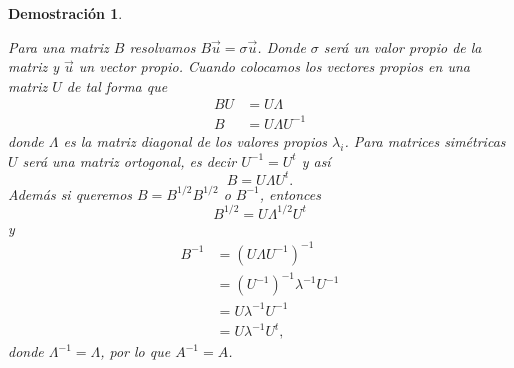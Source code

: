 \documentclass{article}
\newtheorem*{demo}{Demostración}
\begin{document}
\begin{demo}
\begin{enumerate}
    Para una matriz $B$ resolvamos $B\Vec{u}=\sigma\Vec{u}$. Donde $\sigma$ será un valor propio de la matriz y $\Vec{u}$ un vector propio. Cuando colocamos los vectores propios en una matriz $U$ de tal forma que
    \begin{align*}
        BU &= U\Lambda \\
        B &= U\Lambda U^{-1}
    \end{align*}
    donde $\Lambda$ es la matriz diagonal de los valores propios $\lambda_i$. Para matrices simétricas $U$ será una matriz ortogonal, es decir $U^{-1} = U^t$ y así
    \[B = U\Lambda U^t.\]
    Además si queremos $B = B^{1/2}B^{1/2}$ o $B^{-1}$, entonces
    \[B^{1/2} = U \Lambda^{1/2} U^t\]
    y
    \begin{align*}
        B^{-1} &= (U\Lambda U^{-1})^{-1} \\
        &= (U^{-1})^{-1} \lambda^{-1} U^{-1} \\
        &= U \lambda^{-1} U^{-1} \\
        &= U \lambda^{-1} U^t,
    \end{align*}
    donde $\Lambda^{-1} = \Lambda$, por lo que $A^{-1} = A$.
    

\end{enumerate}
\end{demo}
\end{document}
